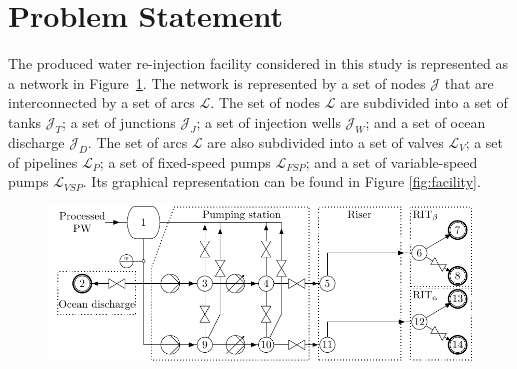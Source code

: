 \section{Problem Statement}
The produced water re-injection facility considered in this study is represented as a network in Figure~\ref{}. The network is represented by a set of nodes $\mathcal{J}$ that are interconnected by a set of arcs $\mathcal{L}$. The set of nodes $\mathcal{L}$ are subdivided into a set of tanks $\mathcal{J}_T$; a set of junctions $\mathcal{J}_J$; a set of injection wells $\mathcal{J}_W$; and a set of ocean discharge $\mathcal{J}_D$. The set of arcs $\mathcal{L}$ are also subdivided into a set of valves $\mathcal{L}_V$; a set of pipelines $\mathcal{L}_P$; a set of fixed-speed pumps $\mathcal{L}_{FSP}$; and  a set of variable-speed pumps $\mathcal{L}_{VSP}$. Its graphical representation can be found in Figure \ref{fig:facility}.
\begin{figure}
\includegraphics[]{PWRI_full_facility.pdf}
\end{figure}

